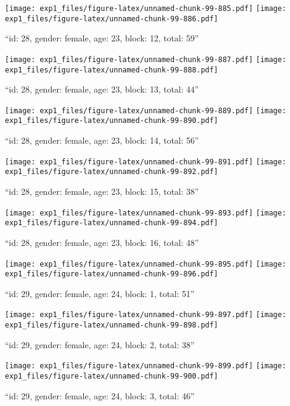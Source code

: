 \documentclass[,]{article}
\begin{document}
\texttt{[image: exp1\_files/figure-latex/unnamed-chunk-99-885.pdf]}
\texttt{[image: exp1\_files/figure-latex/unnamed-chunk-99-886.pdf]}

\newpage
[1] 

``id: 28, gender: female, age: 23, block: 12, total: 59''

\texttt{[image: exp1\_files/figure-latex/unnamed-chunk-99-887.pdf]}
\texttt{[image: exp1\_files/figure-latex/unnamed-chunk-99-888.pdf]}

\newpage
[1] 

``id: 28, gender: female, age: 23, block: 13, total: 44''

\texttt{[image: exp1\_files/figure-latex/unnamed-chunk-99-889.pdf]}
\texttt{[image: exp1\_files/figure-latex/unnamed-chunk-99-890.pdf]}

\newpage
[1] 

``id: 28, gender: female, age: 23, block: 14, total: 56''

\texttt{[image: exp1\_files/figure-latex/unnamed-chunk-99-891.pdf]}
\texttt{[image: exp1\_files/figure-latex/unnamed-chunk-99-892.pdf]}

\newpage
[1] 

``id: 28, gender: female, age: 23, block: 15, total: 38''

\texttt{[image: exp1\_files/figure-latex/unnamed-chunk-99-893.pdf]}
\texttt{[image: exp1\_files/figure-latex/unnamed-chunk-99-894.pdf]}

\newpage
[1] 

``id: 28, gender: female, age: 23, block: 16, total: 48''

\texttt{[image: exp1\_files/figure-latex/unnamed-chunk-99-895.pdf]}
\texttt{[image: exp1\_files/figure-latex/unnamed-chunk-99-896.pdf]}

\newpage
[1] 

``id: 29, gender: female, age: 24, block: 1, total: 51''

\texttt{[image: exp1\_files/figure-latex/unnamed-chunk-99-897.pdf]}
\texttt{[image: exp1\_files/figure-latex/unnamed-chunk-99-898.pdf]}

\newpage
[1] 

``id: 29, gender: female, age: 24, block: 2, total: 38''

\texttt{[image: exp1\_files/figure-latex/unnamed-chunk-99-899.pdf]}
\texttt{[image: exp1\_files/figure-latex/unnamed-chunk-99-900.pdf]}

\newpage
[1] 

``id: 29, gender: female, age: 24, block: 3, total: 46''
\end{document}

